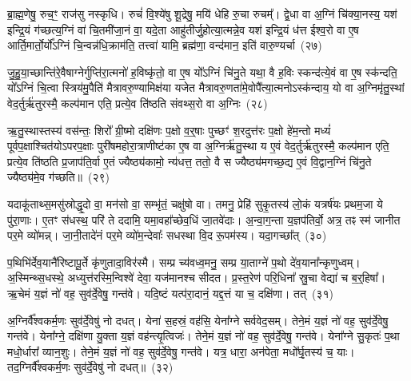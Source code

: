 ब्रा॒ह्म॒णेषु॒ रुच॒ꣳ॒ राज॑सु नस्कृधि। रुचं॑ वि॒श्ये॑षु शू॒द्रेषु॒ मयि॑ धेहि रु॒चा रुचम्᳚। द्वे॒धा वा अ॒ग्निं चि॑क्या॒नस्य॒ यश॑ इन्द्रि॒यं ग॑च्छत्य॒ग्निं वा॑ चि॒तमी॑जा॒नं वा॒ यदे॒ता आहु॑तीर्जु॒होत्या॒त्मन्ने॒व यश॑ इन्द्रि॒यं ध॑त्त ईश्व॒रो वा ए॒ष आर्ति॒मार्तो॒र्यो᳚\-ऽग्निं चि॒न्वन्न॑धि॒क्राम॑ति॒ तत्त्वा॑ यामि॒ ब्रह्म॑णा॒ वन्द॑मान॒ इति॑ वारु॒ण्यर्चा~(२७)\ip

जु॒हु॒या॒च्छान्ति॑रे॒वैषाग्नेर्गुप्ति॑रा॒त्मनो॑ ह॒विष्कृ॑तो॒ वा ए॒ष यो᳚\-ऽग्निं चि॑नु॒ते यथा॒ वै ह॒विः स्कन्द॑त्ये॒वं वा ए॒ष स्क॑न्दति॒ यो᳚\-ऽग्निं चि॒त्वा स्त्रिय॑मु॒पैति॑ मैत्रावरु॒ण्यामिक्ष॑या यजेत मैत्रावरु॒णता॑मे॒वोपै᳚त्या॒त्मनो\-ऽस्क॑न्दाय॒ यो वा अ॒ग्निमृ॑तु॒स्थां वेद॒र्तुर्\mbox{}ऋ॑तुरस्मै॒ कल्प॑मान एति॒ प्रत्ये॒व ति॑ष्ठति संवथ्स॒रो वा अ॒ग्निः~(२८)\ip

ऋ॒तु॒स्थास्तस्य॑ वस॑न्तः॒ शिरो᳚ ग्री॒ष्मो दक्षि॑णः प॒क्षो व॒र्॒\mbox{}षाः पुच्छꣳ॑ श॒रदुत्त॑रः प॒क्षो हे॑म॒न्तो मध्यं॑ पूर्वप॒क्षाश्चित॑यो\-ऽपरप॒क्षाः पुरी॑षमहोरा॒त्राणीष्ट॑का ए॒ष वा अ॒ग्निर्\mbox{}ऋ॑तु॒स्था य ए॒वं वेद॒र्तुर्\mbox{}ऋ॑तुरस्मै॒ कल्प॑मान एति॒ प्रत्ये॒व ति॑ष्ठति प्र॒जा\-प॑ति॒र्वा ए॒तं ज्यैष्ठ्य॑कामो॒ न्य॑धत्त॒ ततो॒ वै स ज्यैष्ठ्य॑मगच्छ॒द्य ए॒वं वि॒द्वान॒ग्निं चि॑नु॒ते ज्यैष्ठ्य॑मे॒व ग॑च्छति॥~(२९)\ip

{\anuvakamend[{पृ॒थि॒वीं य॑च्छ॒ यथ्स्व॑यमातृ॒ण्णा उ॑प॒धाय॑ धेह्यृ॒चाग्निश्चि॑नु॒ते त्रीणि॑ च}]}

यदाकू॑ताथ्स॒मसु॑स्रोद्धृ॒दो वा॒ मन॑सो वा॒ सम्भृ॑तं॒ चक्षु॑षो वा। तमनु॒ प्रेहि॑ सुकृ॒तस्य॑ लो॒कं यत्रर्\mbox{}ष॑यः प्रथम॒जा ये पु॑रा॒णाः। ए॒तꣳ स॑धस्थ॒ परि॑ ते ददामि॒ यमा॒वहा᳚च्छेव॒धिं जा॒तवे॑दाः। अ॒न्वा॒ग॒न्ता य॒ज्ञप॑तिर्वो॒ अत्र॒ तꣴ स्म॑ जानीत पर॒मे व्यो॑मन्न्। जा॒नी॒तादे॑नं पर॒मे व्यो॑म॒न्देवाः᳚ सधस्था वि॒द रू॒पम॑स्य। यदा॒गच्छा᳚त्~(३०)\ip

प॒थिभि॑र्देव॒यानै॑रिष्टापू॒र्ते कृ॑णुतादा॒विर॑स्मै। सम्प्र च्य॑वध्व॒मनु॒ सम्प्र या॒ताग्ने॑ प॒थो दे॑व॒याना᳚न्कृणुध्वम्। अ॒स्मिन्थ्स॒धस्थे॒ अध्युत्त॑रस्मि॒न्विश्वे॑ देवा॒ यज॑मानश्च सीदत। प्र॒स्त॒रेण॑ परि॒धिना᳚ स्रु॒चा वेद्या॑ च ब॒र्॒\mbox{}हिषा᳚। ऋ॒चेमं य॒ज्ञं नो॑ वह॒ सुव॑र्दे॒वेषु॒ गन्त॑वे। यदि॒ष्टं यत्प॑रा॒दानं॒ यद्द॒त्तं या च॒ दक्षि॑णा। तत्~(३१)\ip

अ॒ग्निर्वै᳚श्वकर्म॒णः सुव॑र्दे॒वेषु॑ नो दधत्। येना॑ स॒हस्रं॒ वह॑सि॒ येना᳚ग्ने सर्ववेद॒सम्। तेने॒मं य॒ज्ञं नो॑ वह॒ सुव॑र्दे॒वेषु॒ गन्त॑वे। येना᳚ग्ने॒ दक्षि॑णा यु॒क्ता य॒ज्ञं वह॑न्त्यृ॒त्विजः॑। तेने॒मं य॒ज्ञं नो॑ वह॒ सुव॑र्दे॒वेषु॒ गन्त॑वे। येना᳚ग्ने सु॒कृतः॑ प॒था मधो॒र्धारा᳚ व्यान॒शुः। तेने॒मं य॒ज्ञं नो॑ वह॒ सुव॑र्दे॒वेषु॒ गन्त॑वे। यत्र॒ धारा॒ अन॑पेता॒ मधो᳚र्घृ॒तस्य॑ च॒ याः। तद॒ग्निर्वै᳚श्वकर्म॒णः सुव॑र्दे॒वेषु॑ नो दधत्॥~(३२)\ip

